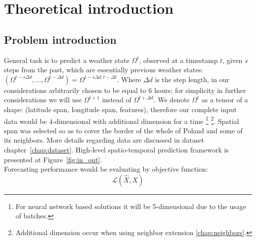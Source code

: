 \chapter{Theoretical introduction}
	
\section{Problem introduction}

General task is to predict a weather state $\Omega^t$, observed at a timestamp $t$, given $s$ steps from the past, which are essentially previous weather states: $(\Omega^{t-s \Delta d}, ..., \Omega^{t-\Delta d})=\Omega^{t-s\Delta d:t-\Delta t}$. Where $\Delta d$ is the step length, in our considerations arbitrarily chosen to be equal to 6 hours; for simplicity in further considerations we will use $\Omega^{t+1}$ instead of $\Omega^{t+\Delta d}$. We denote $\Omega^t$ as a tensor of a shape: (latitude span, longitude span, features), therefore our complete input data would be 4-dimensional with additional dimension for a time \footnote{For neural network based solutions it will be 5-dimensional due to the usage of batches.} \footnote{Additional dimension occur when using neighbor extension \ref{chap:neighbors}.}. Spatial span was selected so as to cover the border of the whole of Poland and some of its neighbors. More details regarding data are discussed in dataset chapter~\ref{chap:dataset}. High-level spatio-temporal prediction framework is presented at Figure~\ref{fig:in_out}. \\

\noindent Forecasting performance would be evaluating by objective function:
\[
    \mathcal{L}(\hat{X}, X)
\]


\newpage

